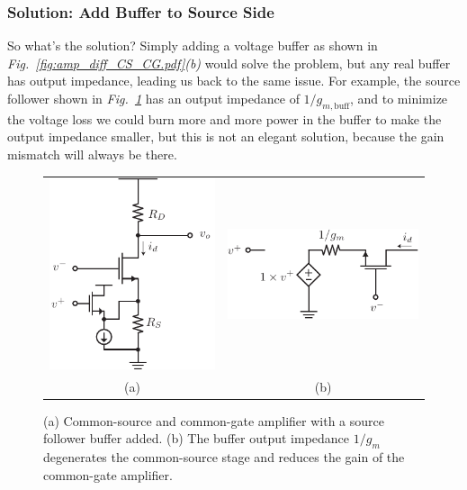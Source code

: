 \subsubsection{Solution:  Add Buffer to Source Side}
So what's the solution? Simply adding a voltage buffer as shown in \emph{Fig.~\ref{fig:amp_diff_CS_CG.pdf}(b)} would solve the problem, but any real buffer has output impedance, leading us back to the same issue.  For example, the source follower shown in \emph{Fig.~\ref{fig:amp_diff_CS_CG_CD.pdf}} has an output impedance of $1/g_{m,\text{buff}}$, and to minimize the voltage loss we could burn more and more power in the buffer to make the output impedance smaller, but this is not an elegant solution, because the gain mismatch will always be there.
\begin{figure}[tb]
\centering
\begin{tabular}{cc}
\includegraphics[scale=1]{amp_diff_CS_CG_CD.pdf} &
\includegraphics[scale=1]{amp_CG_CD_Model.pdf}\\
(a) & (b)\\
\end{tabular}
\caption{(a) Common-source and common-gate amplifier with a source follower buffer added.  (b) The buffer output impedance $1/g_m$ degenerates the common-source stage and reduces the gain of the common-gate amplifier.}
\label{fig:amp_diff_CS_CG_CD.pdf}
\end{figure}
